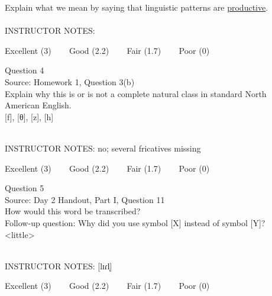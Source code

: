 \documentclass[12pt]{article}
\begin{document}
Explain what we mean by saying that linguistic patterns are \underline{productive}.\\


~\\
INSTRUCTOR NOTES: 


\vfill
Excellent (3) ~~~ Good (2.2) ~~~ Fair (1.7) ~~~ Poor (0)
\newpage

{\large Question 4}\\

Source: Homework 1, Question 3(b)\\

Explain why this is or is not a complete natural class in standard North American English.\\

{[f]}, {[θ]}, {[z]}, {[h]}


~\\
INSTRUCTOR NOTES: no; several fricatives missing


\vfill
Excellent (3) ~~~ Good (2.2) ~~~ Fair (1.7) ~~~ Poor (0)
\newpage

{\large Question 5}\\

Source: Day 2 Handout, Part I, Question 11\\

How would this word be transcribed?\\ Follow-up question: Why did you use symbol [X] instead of symbol [Y]?\\

<little>


~\\
INSTRUCTOR NOTES: [lɪɾl̩]


\vfill
Excellent (3) ~~~ Good (2.2) ~~~ Fair (1.7) ~~~ Poor (0)
\newpage

\begin{center}
\textbf{{\color{red}{\HUGE END OF EXAM}}}\\

\end{center}
\newpage

\begin{center}
\textbf{{\color{blue}{\HUGE START OF EXAM\\}}}

\textbf{{\color{blue}{\HUGE Student ID: 7336\\}}}

\textbf{{\color{blue}{\HUGE 1:15 - 1:30 PM\\}}}

\end{center}
\newpage
\end{document}
